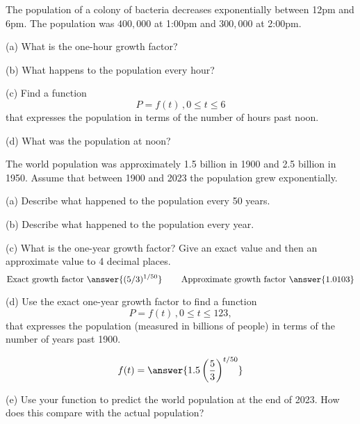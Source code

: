 \documentclass{ximera}
\begin{document}
\begin{question}   \label{Q5:ExdsfderdflG}
The population of a colony of bacteria decreases exponentially between 12pm and 6pm. The population was $400,000$ at 1:00pm and $300,000$ at 2:00pm. 

(a) What is the one-hour growth factor?

(b) What happens to the population every hour?

(c) Find a function 
\[
     P = f(t) \, , 0\leq t \leq 6 
\]
that expresses the population in terms of the number of hours past noon.

(d) What was the population at noon?

\end{question}



\begin{question}   \label{Q6:ExponentialG}
The world population was approximately 1.5 billion in 1900 and 2.5 billion in 1950. Assume that between 1900 and 2023 the population grew exponentially.

(a) Describe what happened to the population every 50 years.

(b) Describe what happened to the population every year.

(c) What is the one-year growth factor? Give an exact value and then an approximate value to 4 decimal places.
\[
   \text{Exact growth factor }  \answer{(5/3)^{1/50}} \hskip 0.3 in  \text{Approximate growth factor } \answer{1.0103}
\]

(d) Use the exact one-year growth factor to find a function
\[
     P = f(t) \, , 0\leq t \leq 123 ,
\]
that expresses the population (measured in billions of people) in terms of the number of years past 1900.

\[
   f(t) = \answer{1.5 \left(\frac{5}{3}\right)^{t/50}}
\]

(e) Use your function to predict the world population at the end of 2023. How does this compare with the actual population?

\end{question}
\end{document}
